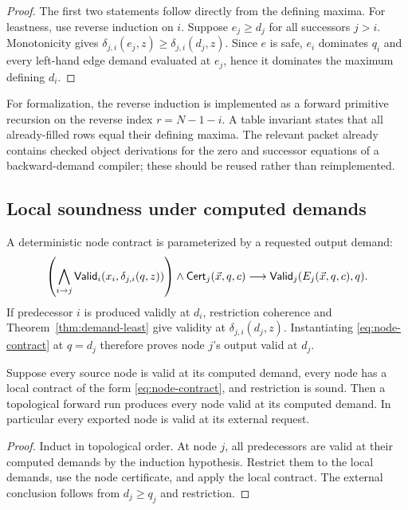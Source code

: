 \begin{proof}
The first two statements follow directly from the defining maxima.  For
leastness, use reverse induction on \(i\).  Suppose \(e_j\geq d_j\) for all
successors \(j>i\).  Monotonicity gives
\(\delta_{j,i}(e_j,z)\geq\delta_{j,i}(d_j,z)\).  Since \(e\) is safe,
\(e_i\) dominates \(q_i\) and every left-hand edge demand evaluated at
\(e_j\), hence it dominates the maximum defining \(d_i\).
\end{proof}

For formalization, the reverse induction is implemented as a forward primitive
recursion on the reverse index \(r=N-1-i\).  A table invariant states that all
already-filled rows equal their defining maxima.  The relevant packet already
contains checked object derivations for the zero and successor equations of a
backward-demand compiler; these should be reused rather than reimplemented.

\subsection{Local soundness under computed demands}

A deterministic node contract is parameterized by a requested output demand:
\begin{equation}
 \left(\bigwedge_{i\to j}
  \mathsf{Valid}_i(x_i,\delta_{j,i}(q,z))\right)
 \wedge \mathsf{Cert}_j(\vec x,q,c)
 \longrightarrow
 \mathsf{Valid}_j(E_j(\vec x,q,c),q).
 \label{eq:node-contract}
\end{equation}
If predecessor \(i\) is produced validly at \(d_i\), restriction coherence and
Theorem~\ref{thm:demand-least} give validity at
\(\delta_{j,i}(d_j,z)\).  Instantiating \eqref{eq:node-contract} at
\(q=d_j\) therefore proves node \(j\)'s output valid at \(d_j\).

\begin{theorem}
\label{thm:forward-validity}
Suppose every source node is valid at its computed demand, every node has a
local contract of the form \eqref{eq:node-contract}, and restriction is sound.
Then a topological forward run produces every node valid at its computed
demand.  In particular every exported node is valid at its external request.
\end{theorem}

\begin{proof}
Induct in topological order.  At node \(j\), all predecessors are valid at
their computed demands by the induction hypothesis.  Restrict them to the
local demands, use the node certificate, and apply the local contract.  The
external conclusion follows from \(d_j\geq q_j\) and restriction.
\end{proof}

